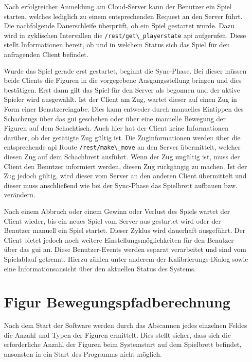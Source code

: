 Nach erfolgreicher Anmeldung am Cloud-Server kann der Benutzer ein Spiel
starten, welches lediglich zu einem entsprechenden Request an den Server
führt. Die nachfolgende Dauerschleife überprüft, ob ein Spiel gestartet
wurde. Dazu wird in zyklischen Intervallen die
\passthrough{\lstinline!/rest/get\_playerstate!} \gls{api} aufgerufen.
Diese stellt Informationen bereit, ob und in welchem Status sich das
Spiel für den anfragenden Client befindet.

Wurde das Spiel gerade erst gestartet, beginnt die Sync-Phase. Bei
dieser müssen beide Clients die Figuren in die vorgegebene
Ausgangsstellung bringen und dies bestätigen. Erst dann gilt das Spiel
für den Server als begonnen und der aktive Spieler wird ausgewählt. Ist
der Client am Zug, wartet dieser auf einen Zug in Form einer
Benutzereingabe. Dies kann entweder durch manuelles Eintippen des
Schachzugs über das \gls{gui} geschehen oder über eine manuelle Bewegung
der Figuren auf dem Schachtisch. Auch hier hat der Client keine
Informationen darüber, ob der getätigte Zug gültig ist. Die
Zuginformationen werden über die entsprechende \gls{api} Route
\passthrough{\lstinline!/rest/make\_move!} an den Server übermittelt,
welcher diesen Zug auf dem Schachbrett ausführt. Wenn der Zug ungültig
ist, muss der Client den Benutzer informiert werden, diesen Zug
rückgängig zu machen. Ist der Zug jedoch gültig, wird dieser vom Server
an den anderen Client übermittelt und dieser muss anschließend wie bei
der Sync-Phase das Spielbrett aufbauen bzw. verändern.

Nach einem Abbruch oder einem Gewinn oder Verlust des Spiels wartet der
Client wieder, bis ein neues Spiel vom Server aus gestartet wird oder
der Benutzer manuell ein Spiel startet. Dieser Zyklus wird dauerhaft
ausgeführt. Der Client bietet jedoch noch weitere
Einstellungsmöglichkeiten für den Benutzer über das \gls{gui} an. Diese
Benutzer-Events werden separat verarbeitet und sind vom Spielablauf
getrennt. Hierzu zählen unter anderem der Kalibrierungs-Dialog sowie
eine Informationsansicht über den aktuellen Status des Systems.

\hypertarget{figur-bewegungspfadberechnung}{%
\section{Figur
Bewegungspfadberechnung}\label{figur-bewegungspfadberechnung}}

Nach dem Start der Software werden durch das Abscannen jedes einzelnen
Feldes die Anzahl und Typen der Figuren ermittelt. Dies stellt sicher,
dass sich die erforderliche Anzahl der Figuren beim Systemstart auf dem
Spielbrett befindet, ansonsten in ein Start des Programms nicht möglich.


